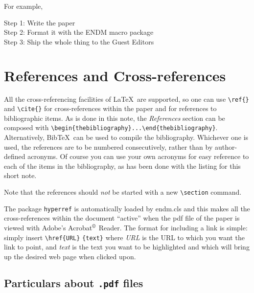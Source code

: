 \documentclass{endm}
\begin{document}
For example,

\begin{algorithm}[h]
\begin{alg}
Step 1: Write the paper\\
Step 2: Format it with the ENDM macro package\\
Step 3: Ship the whole thing to the Guest Editors\\
\end{alg}
\end{algorithm}


\section{References and Cross-references}

All the cross-referencing facilities of \LaTeX\ are supported, so one
can use \verb+\ref{}+ and \verb+\cite{}+ for cross-references within
the paper and for references to bibliographic items. As is done in this
note, the \emph{References} section can be composed with
\verb+\begin{thebibliography}...\end{thebibliography}+. Alternatively,
Bib\TeX\ can be used to compile the bibliography. Whichever one is used,
the references are to be numbered consecutively, rather than by
author-defined acronyms. Of course you can use your own acronyms for
easy reference to each of the items in the bibliography, as has been
done with the listing for this short note.

Note that the references should \emph{not} be started with a new
\verb+\section+ command.

The package \texttt{hyperref} is automatically loaded by endm.cls and
this makes all the cross-references within the document ``active'' when
the pdf file of the paper is viewed with Adobe's Acrobat$^{\copyright}$
Reader. The format for including a link is simple: simply
insert \verb+\href{URL}+ \verb+{text}+ where \emph{URL} is the URL to
which you want the link to point, and \emph{text} is the text you want
to be highlighted and which will bring up the desired web page when
clicked upon.

\subsection{Particulars about {\normalshape \texttt{.pdf} files}}
\end{document}
